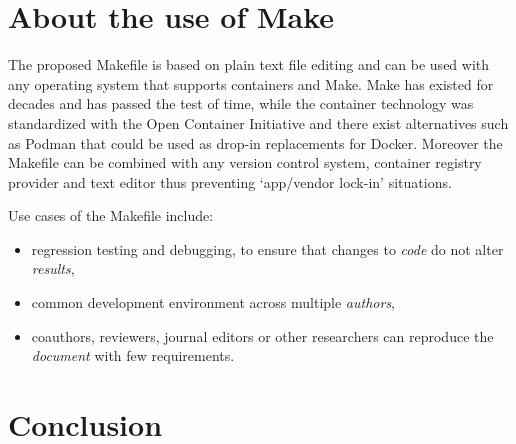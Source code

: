 \documentclass[journal]{IEEEtran}
\begin{document}
\section{About the use of Make}
The proposed Makefile is based on plain text file editing and can be used with any operating system that supports containers and Make.
Make has existed for decades and has passed the test of time, while the container technology was standardized with the Open Container Initiative and there exist alternatives such as Podman that could be used as drop-in replacements for Docker.
Moreover the Makefile can be combined with any version control system, container registry provider and text editor thus preventing `app/vendor lock-in' situations.

Use cases of the Makefile include:
\begin{itemize}
	\item regression testing and debugging, to ensure that changes to \textit{code} do not alter \textit{results},
	\item common development environment across multiple \textit{authors},
	\item coauthors, reviewers, journal editors or other researchers can reproduce the \textit{document} with few requirements.
\end{itemize}

\section*{Conclusion}



\end{document}
